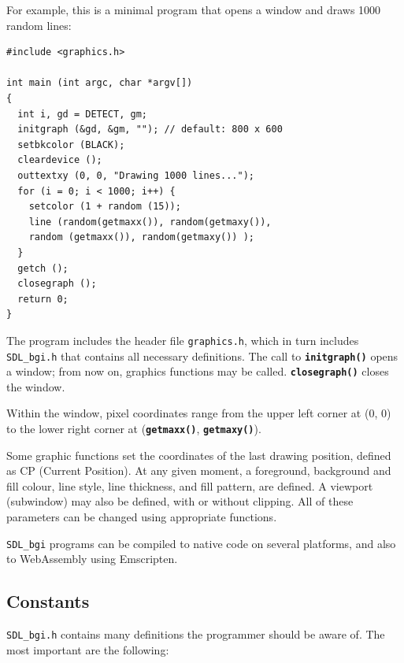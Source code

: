 \documentclass[a4paper,12pt]{article}
\newcommand{\func}[1]{\textbf{\texttt{#1}}}  %
\newcommand{\F}[1]{\texttt{#1}}     %
\newcommand{\SDLbgi}{\texttt{SDL\_bgi}}
\begin{document}
For example, this is a minimal program that opens a  window and draws
1000 random lines:

\begin{small}
\begin{spacing}{0.9}
\begin{verbatim}
#include <graphics.h>

int main (int argc, char *argv[])
{
  int i, gd = DETECT, gm;
  initgraph (&gd, &gm, ""); // default: 800 x 600
  setbkcolor (BLACK);
  cleardevice ();
  outtextxy (0, 0, "Drawing 1000 lines...");
  for (i = 0; i < 1000; i++) {
    setcolor (1 + random (15));
    line (random(getmaxx()), random(getmaxy()),
    random (getmaxx()), random(getmaxy()) );
  }
  getch ();
  closegraph ();
  return 0;
}
\end{verbatim}
\end{spacing}
\end{small}

The program includes the header file \F{graphics.h}, which in turn
includes \F{SDL\_bgi.h} that contains all necessary definitions. The
call to \func{initgraph()} opens a window; from now on, graphics
functions may be called. \func{closegraph()} closes the window.

Within the window, pixel coordinates range from the upper left corner
at (0, 0) to the lower right corner at (\func{get\-maxx()},
\func{getmaxy()}).

Some graphic functions set the coordinates of the last drawing
position, defined as CP (Current Position). At any given moment, a
foreground, background and fill colour, line style, line thickness,
and fill pattern, are defined. A viewport (subwindow) may also be
defined, with or without clipping. All of these parameters can be
changed using appropriate functions.

\SDLbgi{} programs can be compiled to native code on several
platforms, and also to WebAssembly using Emscripten.


\subsection{Constants}

\F{SDL\_bgi.h} contains many definitions the programmer should be
aware of. The most important are the following:
\end{document}
